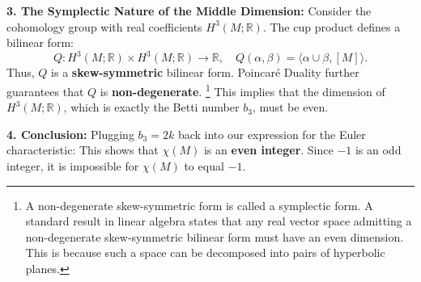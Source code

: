 \begin{solution}
\textbf{3. The Symplectic Nature of the Middle Dimension:}
Consider the cohomology group with real coefficients $H^3(M; \mathbb{R})$. The cup product defines a bilinear form:
\[
Q: H^3(M; \mathbb{R}) \times H^3(M; \mathbb{R}) \to \mathbb{R}, \quad Q(\alpha, \beta) = \langle \alpha \cup \beta, [M] \rangle.
\]
Thus, $Q$ is a \textbf{skew-symmetric} bilinear form. Poincaré Duality further guarantees that $Q$ is \textbf{non-degenerate}.
\footnote{A non-degenerate skew-symmetric form is called a symplectic form. A standard result in linear algebra states that any real vector space admitting a non-degenerate skew-symmetric bilinear form must have an even dimension. This is because such a space can be decomposed into pairs of hyperbolic planes.}
This implies that the dimension of $H^3(M; \mathbb{R})$, which is exactly the Betti number $b_3$, must be even.

\textbf{4. Conclusion:}
Plugging $b_3 = 2k$ back into our expression for the Euler characteristic:
This shows that $\chi(M)$ is an \textbf{even integer}.
Since $-1$ is an odd integer, it is impossible for $\chi(M)$ to equal $-1$.
\end{solution}

